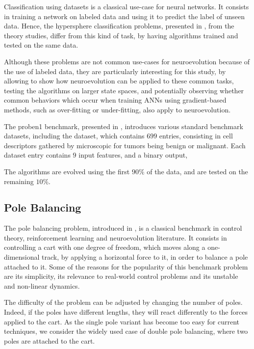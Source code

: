 Classification using datasets is a classical use-case for neural networks. It consists in training a network on labeled data and using it to
predict the label of unseen data. Hence, the hypersphere classification problems, presented in , from the
theory studies, differ from this kind of task, by having algorithms trained and tested on the same data.

Although these problems are not common use-cases for neuroevolution because of the use of labeled data,
they are particularly interesting for this study, by allowing to show how neuroevolution can be applied to these common tasks, testing
the algorithms on larger state spaces, and potentially observing whether common behaviors which occur when training ANNs using gradient-based methods,
such as over-fitting or under-fitting, also apply to neuroevolution.

The proben1 benchmark, presented in \cite{...}, introduces various standard benchmark datasets, including the  dataset, which
contains $699$ entries, consisting in cell descriptors gathered by microscopic for tumors being benign or malignant.
Each dataset entry contains $9$ input features, and a binary output,

The algorithms are evolved using the first $90\%$ of the data, and are tested on the remaining $10\%$.

\subsection{Pole Balancing}

The pole balancing problem, introduced in \cite{...}, is a classical benchmark in control theory, reinforcement learning and neuroevolution literature.
It consists in controlling a cart with one degree of freedom, which moves along a one-dimensional track, by applying a horizontal force to it, in order to balance a pole attached to it.
Some of the reasons for the popularity of this benchmark problem are its simplicity, its relevance to real-world control problems and its unstable and non-linear dynamics.


The difficulty of the problem can be adjusted by changing the number of poles. Indeed, if the poles have different lengths, they will react differently to the forces applied to the cart.
As the single pole variant has become too easy for current techniques, we consider the widely used case of double pole balancing, where two poles are attached to the cart.

